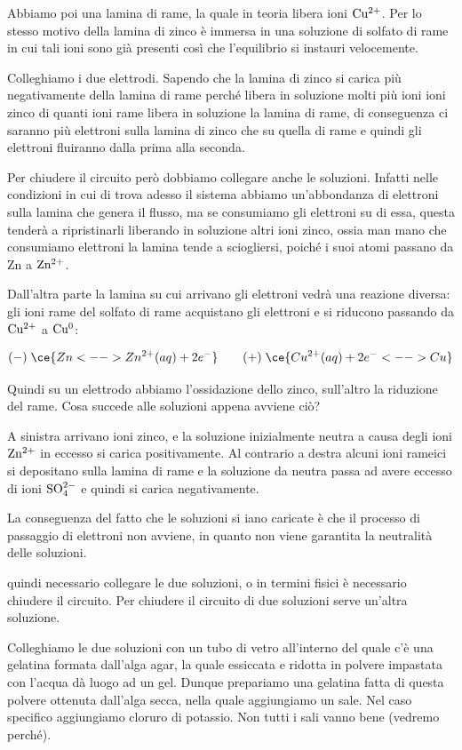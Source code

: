 Abbiamo poi una lamina di rame, la quale in teoria libera ioni $\rm Cu^{2+}$. Per lo stesso motivo della lamina di zinco è immersa in una soluzione di solfato di rame in cui tali ioni sono già presenti così che l'equilibrio si instauri velocemente.

Colleghiamo i due elettrodi. Sapendo che la lamina di zinco si carica più negativamente della lamina di rame perché libera in soluzione molti più ioni ioni zinco di quanti ioni rame libera in soluzione la lamina di rame, di conseguenza ci saranno più elettroni sulla lamina di zinco che su quella di rame e quindi gli elettroni fluiranno dalla prima alla seconda.

Per chiudere il circuito però dobbiamo collegare anche le soluzioni. Infatti nelle condizioni in cui di trova adesso
il sistema abbiamo un'abbondanza di elettroni sulla lamina che genera il flusso, ma se consumiamo gli elettroni su di essa, questa tenderà a ripristinarli liberando in soluzione altri ioni zinco, ossia man mano che consumiamo elettroni la lamina tende a sciogliersi, poiché i suoi atomi passano da Zn a $\rm Zn^{2+}$.

Dall'altra parte la lamina su cui arrivano gli elettroni vedrà una reazione diversa: gli ioni rame del solfato di rame acquistano gli elettroni e si riducono passando da $\rm Cu^{2+}$ a $\rm Cu^0$:

$$(-) \; \ce{Zn <--> Zn^{2+}(aq) + 2e^-} \qquad (+) \; \ce{ Cu^{2+}(aq) + 2e^- <--> Cu}$$

Quindi su un elettrodo abbiamo l'ossidazione dello zinco, sull'altro la riduzione del rame. Cosa succede alle soluzioni appena avviene ciò?

A sinistra arrivano ioni zinco, e la soluzione inizialmente neutra a causa degli ioni $\rm Zn^{2+}$ in eccesso si carica positivamente. Al contrario a destra alcuni ioni rameici si depositano sulla lamina di rame e la soluzione da neutra passa ad avere eccesso di ioni $\rm SO_4^{2-}$ e quindi si carica negativamente.

La conseguenza del fatto che le soluzioni si iano caricate è che il processo di passaggio di elettroni non avviene, in quanto non viene garantita la neutralità delle soluzioni.

\E quindi necessario collegare le due soluzioni, o in termini fisici è necessario chiudere il circuito. Per chiudere il circuito di due soluzioni serve un'altra soluzione.

Colleghiamo le due soluzioni con un tubo di vetro all'interno del quale c'è una gelatina formata dall'alga agar, la quale essiccata e ridotta in polvere impastata con l'acqua dà luogo ad un gel. Dunque prepariamo una gelatina fatta di questa polvere ottenuta dall'alga secca, nella quale aggiungiamo un sale. Nel caso specifico aggiungiamo cloruro di potassio. Non tutti i sali vanno bene (vedremo perché).

